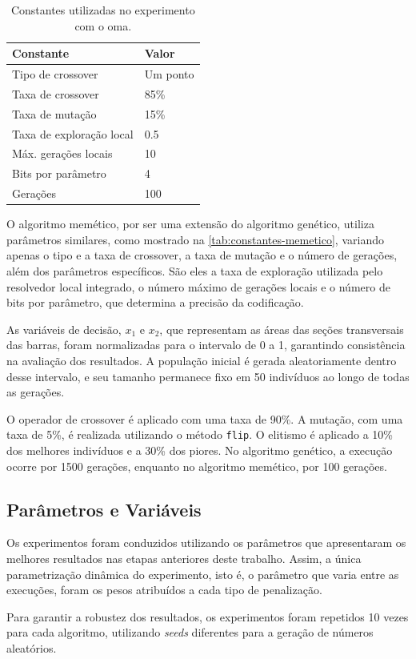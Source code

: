 \begin{table}[htb]
    \center%
    \begin{tabular}{l l}
        \bottomrule
        \textbf{Constante}       & \textbf{Valor} \\ \midrule
        Tipo de crossover        & Um ponto       \\ \midrule
        Taxa de crossover        & 85\%           \\ \midrule
        Taxa de mutação          & 15\%           \\ \midrule
        Taxa de exploração local & 0.5            \\ \midrule
        Máx. gerações locais     & 10             \\ \midrule
        Bits por parâmetro       & 4              \\ \midrule
        Gerações                 & 100            \\ \toprule
    \end{tabular}
    \caption{Constantes utilizadas no experimento com o \gls{oma}.}%
    \label{tab:constantes-memetico}
\end{table}

O algoritmo memético, por ser uma extensão do algoritmo genético, utiliza parâmetros similares, como mostrado na \autoref{tab:constantes-memetico}, variando apenas o tipo e a taxa de \gls{crossover}, a taxa de mutação e o número de gerações, além dos parâmetros específicos.
São eles a taxa de exploração utilizada pelo resolvedor local integrado, o número máximo de gerações locais e o número de bits por parâmetro, que determina a precisão da codificação.

As variáveis de decisão, \(x_1\) e \(x_2\), que representam as áreas das seções transversais das barras, foram normalizadas para o intervalo de 0 a 1, garantindo consistência na avaliação dos resultados. A população inicial é gerada aleatoriamente dentro desse intervalo, e seu tamanho permanece fixo em 50 indivíduos ao longo de todas as gerações.

O operador de \gls{crossover} é aplicado com uma taxa de 90\%. A mutação, com uma taxa de 5\%, é realizada utilizando o método \texttt{flip}. O elitismo é aplicado a 10\% dos melhores indivíduos e a 30\% dos piores. No algoritmo genético, a execução ocorre por 1500 gerações, enquanto no algoritmo memético, por 100 gerações.

\subsection{Parâmetros e Variáveis}

Os experimentos foram conduzidos utilizando os parâmetros que apresentaram os melhores resultados nas etapas anteriores deste trabalho. Assim, a única parametrização dinâmica do experimento, isto é, o parâmetro que varia entre as execuções, foram os pesos atribuídos a cada tipo de penalização.

Para garantir a robustez dos resultados, os experimentos foram repetidos 10 vezes para cada algoritmo, utilizando \textit{seeds} diferentes para a geração de números aleatórios.